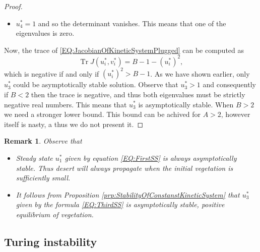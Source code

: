 \documentclass[12pt, a4paper]{article}
\theoremstyle{break}
\theoremstyle{break}
\theoremstyle{break}
\theoremstyle{break}
\newtheorem{rem}{Remark}[section]
\theoremstyle{break}
\theoremstyle{break}
\theoremstyle{break}
\DeclareMathOperator{\Tr}{Tr}
\begin{document}
\begin{proof}
\begin{itemize}
        \item $u_4^* = 1$ and so the determinant vanishes. This means that one of the eigenvalues is zero.
    \end{itemize}
    Now, the trace of \eqref{EQ:JacobianOfKineticSystemPlugged} can be computed as
    \begin{equation}
        \label{EQ:TraceLinearizationKinetic}
        \Tr J(u^*_i, v^*_i) = B - 1 - (u_i^*)^2,
    \end{equation}
    which is negative if and only if $(u_i^*)^2 > B - 1$. As we have shown earlier, only $u_3^*$ could be asymptotically stable solution. Observe that $u_3^* > 1$ and consequently if $B < 2$ then the trace is negative, and thus both eigenvalues must be strictly negative real numbers. This means that $u_3^*$ is asymptotically stable. When $B > 2$ we need a stronger lower bound. This bound can be achived for $A > 2$, however itself is nasty, a thus we do not present it.
\end{proof}
\begin{rem}
    Observe that
    \begin{itemize}
        \item Steady state $u_1^*$ given by equation \eqref{EQ:FirstSS} is always asymptotically stable. Thus desert will always propagate when the initial vegetation is sufficiently small.
        \item It follows from Proposition \ref{prp:StabilityOfConstanstKineticSystem} that $u_3^*$ given by the formula \eqref{EQ:ThirdSS} is asymptotically stable, positive equilibrium of vegetation.
    \end{itemize}
\end{rem}

\subsection{Turing instability}
\end{document}
